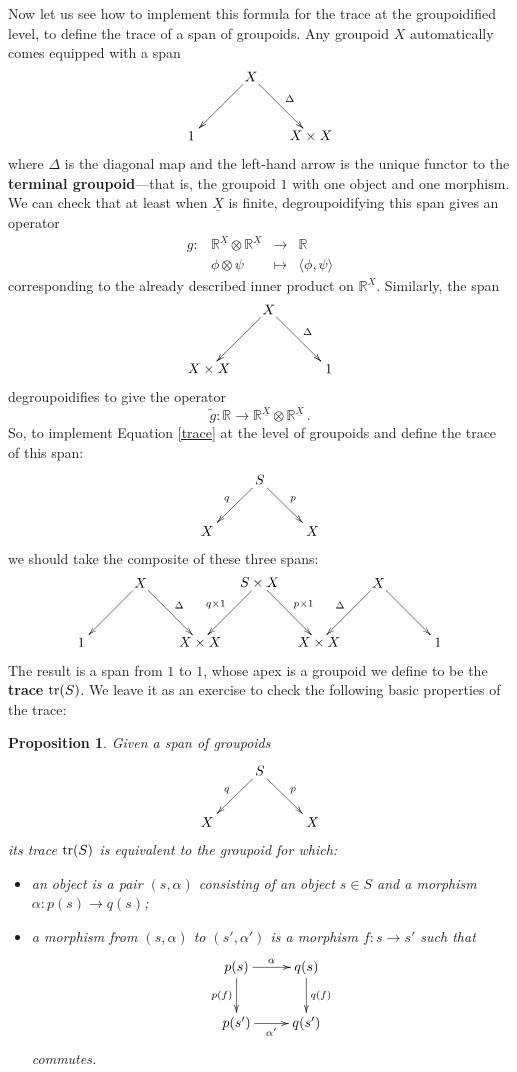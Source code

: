 \documentclass{article}
\renewcommand{\to}{\rightarrow}
\newcommand{\tensor}{\otimes}
\newcommand{\maps}{\colon}
\newcommand{\tr}{{\rm tr}}
\newcommand{\R}{{\mathbb R}}
\renewcommand{\u}[1]{\underline{#1}}
\newtheorem*{proposition*}{Proposition}
\begin{document}
Now let us see how to implement this formula for the trace at the
groupoidified level, to define the trace of a span of groupoids.
Any groupoid $X$ automatically comes equipped with a span
\[
\xy
(0,15)*{\emph{ }X\emph{ }}="B";(-15,0)*{1}="A";(15,0)*{X\times X}="C";
{\ar_{} (-2,13);(-13,2)};
{\ar^{\Delta} (2,13);(13,2)};
\endxy
\]
where $\Delta$ is the diagonal map
and the left-hand arrow is the unique functor to the \textbf{terminal 
groupoid}---that is, the groupoid $1$ with one object and one morphism.  
We can check that at least when $\u{X}$ is finite, degroupoidifying
this span gives an operator
\[
\begin{array}{cccl}
g \maps & \R^{\u{X}} \tensor \R^{\u{X}} & \to & \R  \\
        &  \phi \tensor \psi        & \mapsto & \langle \phi, \psi \rangle 
\end{array}
\]
corresponding to the already described inner product on $\R^{\u{X}}$.  
Similarly, the span
\[\xy
(0,15)*{\emph{ }X\emph{ }}="B";(-15,0)*{X\times X}="A";(15,0)*{1}="C";
{\ar_{} (-2,13);(-13,2)};
{\ar^{\Delta} (2,13);(13,2)};
\endxy\]
degroupoidifies to give the operator
\[  \tilde{g} \maps \R  \to \R^{\u{X}} \tensor \R^{\u{X}} \, .\]
So, to implement Equation \ref{trace} at the level of groupoids 
and define the trace of this span:
\[
\xymatrix{
& S \ar[dl]_q \ar[dr]^p & \\
X & & X  
}
\]
we should take the composite of these three spans:
\[\xy
(0,15)*{S \times X}="B";(-15,0)*{X\times X}="A";(15,0)*{X\times X}="C";
{\ar_{q\times 1} (-2,13);(-13,2)};
{\ar^{p\times 1} (2,13);(13,2)};
(-30,15)*{X}="D";(-45,0)*{1}="E";
{\ar_{} (-32,13);(-43,2)};
{\ar^{\Delta} (-28,13);(-17,2)};
(30,15)*{X}="F";(45,0)*{1}="G";
{\ar_{\Delta} (28,13);(17,2)};
{\ar^{} (32,13);(43,2)};
\endxy
\]
The result is a span from $1$ to $1$, whose apex is a groupoid we
define to be the {\bf trace} $\tr(S)$.  We leave it as an
exercise to check the following basic properties of the trace:

\begin{proposition*}
Given a span of groupoids
\[
\xymatrix{
& S \ar[dl]_q \ar[dr]^p & \\
X & & X  
}
\]
its trace $\tr(S)$ is equivalent to the groupoid for which:
\begin{itemize}
\item an object is a pair $(s,\alpha)$ consisting of
an object $s \in S$ and a morphism $\alpha \maps p(s) \to q(s)$;
\item a morphism from $(s,\alpha)$ to $(s',\alpha')$ is a morphism
$f \maps s \to s'$ such that
\[
\xymatrix{
p(s) \ar[d]_{p(f)} \ar[r]^{\alpha} & q(s) \ar[d]^{q(f)} \\
p(s') \ar[r]_{\alpha'} & q(s')
}
\]
commutes.
\end{itemize}
\end{proposition*}
\end{document}
